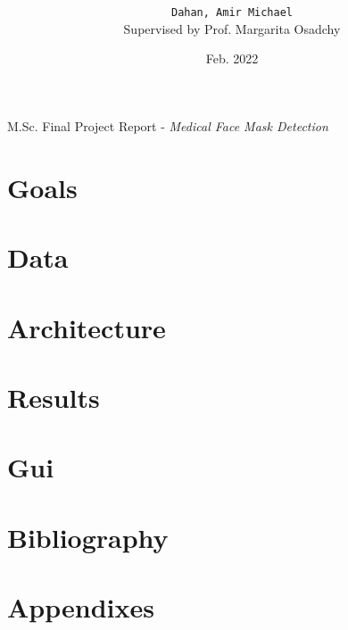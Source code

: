 

\title{ }

\author{
  \texttt{Dahan, Amir Michael}\\
  Supervised by Prof. Margarita Osadchy
}
\date{Feb. 2022}



\maketitle

M.Sc. Final Project Report - \emph{Medical Face Mask Detection}

    \clearpage
    \tableofcontents
    \clearpage

    \section{Goals}\label{sec:goals}
    

    \section{Data}\label{sec:Data}
    

    \section{Architecture}\label{sec:architecture}
    

    \section{Results}\label{sec:results}
    

    \section{Gui}\label{sec:gui}
    

    \section{Bibliography}\label{sec:bibliography}
    

    \clearpage
    \section{Appendixes}\label{sec:appendixes}
    

